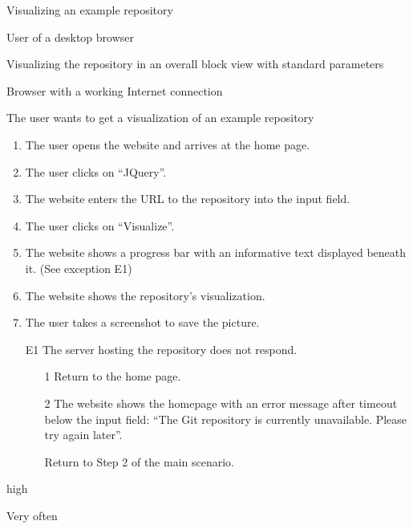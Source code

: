 \documentclass[11pt]{scrartcl}
\begin{document}
\begin{description}[leftmargin=!,labelwidth=\widthof{\bfseries Frequency of use:}]
	\item[Use-case:] Visualizing an example repository 
	\item[Primary actor:] User of a desktop browser 
	\item[Goal in context:] Visualizing the repository in an overall block view with standard parameters 
	\item[Preconditions:] Browser with a working Internet connection
	\item[Trigger:] The user wants to get a visualization of an example repository

	\item[Scenario:]
		\begin{enumerate}[leftmargin=1.5em]
			\item The user opens the website and arrives at the home page.
			\item The user clicks on \enquote{JQuery}.
			\item The website enters the URL to the repository into the input field.
			\item The user clicks on \enquote{Visualize}.
			\item The website shows a progress bar with an informative text displayed beneath
				it. (See exception E1)
			\item The website shows the repository's visualization.
			\item The user takes a screenshot to save the picture. 
		\end{enumerate}

	\item[Exceptions:]
		\begin{enumerate}[leftmargin=1.5em]
			\item[E1] The server hosting the repository does not respond.
				\begin{enumerate}
					\item[1] Return to the home page.
					\item[2] The website shows the homepage with an error message after timeout below the input 	
						field: 	\enquote{The Git repository is currently unavailable. Please try again later}.
					\item[] Return to Step 2 of the main scenario.
					
				\end{enumerate}
		\end{enumerate}

	\item[Priority:] high
	\item[Frequency of use:] Very often

\end{description}
\end{document}
